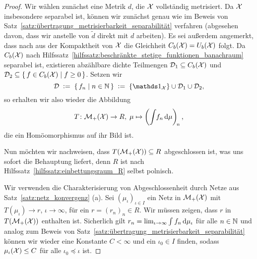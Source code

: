 \documentclass[../thesis/thesis.tex]{subfiles}
\begin{document}
	\begin{proof}
		Wir wählen zunächst eine Metrik $d$, die $\mathcal{X}$ vollständig metrisiert. Da $\mathcal{X}$ insbesondere separabel ist, können wir zunächst genau wie 
		im Beweis von Satz~\ref{satz:übertragung_metrisierbarkeit_separabilität} verfahren
		(abgesehen davon, dass wir anstelle von $\tilde{d}$ direkt mit $d$ arbeiten). Es sei außerdem angemerkt, dass nach \cite[Theorem 2.4.1]{Simon.2015} aus der Kompaktheit von $\mathcal{X}$ die Gleichheit $C_b(\mathcal{X}) = U_b(\mathcal{X})$ folgt. Da $C_b(\mathcal{X})$ nach Hilfssatz~\ref{hilfssatz:beschränkte_stetige_funktionen_banachraum} separabel ist, existieren abzählbare dichte Teilmengen $\mathcal{D}_1 \subseteq C_b(\mathcal{X})$ und $\mathcal{D}_2 \subseteq \left\{\, f \in C_b(\mathcal{X}) \; \middle| \; f \geq 0 \,\right\}$. Setzen wir 
		\[ \mathcal{D} \; \defby \; \setcomp{f_n}{n \in \N} \; \defby \; \set{\indfct_\X} \cup \mathcal{D}_1 \cup \mathcal{D}_2 \text{,} \] 
		so erhalten wir also wieder die Abbildung
		\[ T \colon \mathcal{M}_{+}(\mathcal{X}) \to R, \; \mu \mapsto \left( \int_{} \, f_n \, \mathrm{d}\mu \right)_{\! n}  \text{,} \]
		die ein Homöomorphismus auf ihr Bild ist. 
		
		Nun möchten wir nachweisen, dass $T(\mathcal{M}_{+}(\mathcal{X})) \subseteq R$ abgeschlossen ist, was uns sofort die Behauptung liefert, denn $R$ ist nach Hilfssatz~\ref{hilfssatz:einbettungsraum_R} selbst polnisch.
		
		Wir verwenden die Charakterisierung von Abgeschlossenheit 
		durch Netze aus Satz~\ref{satz:netz_konvergenz} (a). Sei $(\mu_\iota)_{\iota \in I}$ ein Netz in $\mathcal{M}_{+}(\mathcal{X})$ mit $T(\mu_\iota) \to r$, $\iota \to \infty$,
		für ein $r = (r_n)_n \in R$. Wir müssen zeigen, dass $r$ in $T(\mathcal{M}_{+}(\mathcal{X}))$ enthalten ist. Sicherlich gilt
		$r_n = \lim_{\iota \to \infty} \int_{} \, f_n \, \mathrm{d}\mu_\iota$ für alle $n \in \mathbb{N}$ und analog zum Beweis von Satz~\ref{satz:übertragung_metrisierbarkeit_separabilität} 
		können wir wieder eine Konstante $C < \infty$ und ein $\iota_0 \in I$ finden, sodass $\mu_\iota(\mathcal{X}) \leq C$ für alle $\iota_0 \preceq \iota$ ist.
		

\end{proof}
\end{document}
